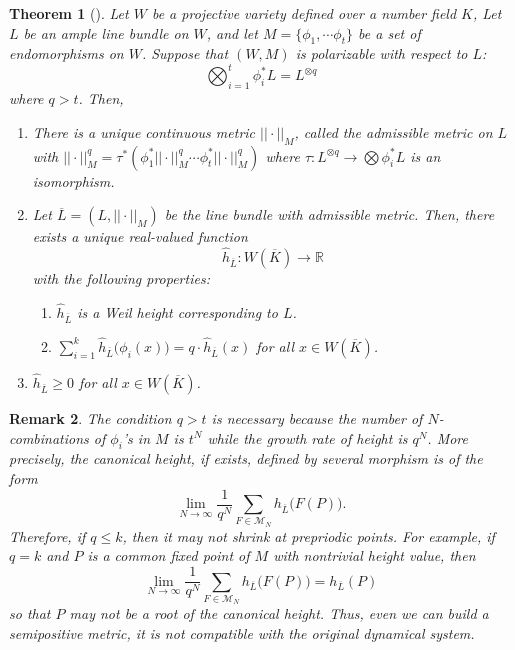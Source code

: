 \documentclass[11pt,letterpaper]{amsart}
\newtheorem{thm}{Theorem}[section]
\newtheorem{rem}[thm]{Remark}
\begin{document}
    \begin{thm}[{\cite[Theorem A,B]{K0}}]\label{kawa}
        Let $W$ be a projective variety defined over a number field $K$, Let $L$ be an ample line bundle on $W$, and let $M = \{\phi_1, \cdots \phi_t\}$ be a set of endomorphisms on $W$. Suppose that $(W,M)$ is polarizable with respect to $L$:
        \[
        \bigotimes_{i=1}^t \phi_i^*L = L^{\otimes q}
        \]
        where $q>t$. Then,
            \begin{enumerate}
                \item There is a unique continuous metric $||\cdot ||_M$, called the admissible metric on $L$ with $||\cdot ||^q_M = \tau^*(\phi_1^*|| \cdot ||^q_M \cdots \phi_t^* ||\cdot ||^q_M)$ where $\tau : L^{\otimes q} \rightarrow \bigotimes \phi_i^*L$ is an isomorphism.
                \item Let $\overline{L}= (L, ||\cdot||_M)$ be the line bundle with admissible metric. Then, there exists a unique real-valued function
                    \[
                        \widehat{h}_{\overline{L}} : W(\overline{K}) \rightarrow \mathbb{R}
                    \]
                with the following properties:
                    \begin{enumerate}
                        \item $\widehat{h}_{\overline{L}}$ is a Weil height corresponding to $L$.
                        \item $\displaystyle \sum_{i=1}^k \widehat{h}_{\overline{L}} \bigl( \phi_i(x)\bigr) = q \cdot \widehat{h}_{\overline{L}} (x)$ for all $x \in W(\overline{K})$.
                    \end{enumerate}
                \item $\widehat{h}_{\overline{L}} \geq 0$ for all $x\in W(\overline{K})$.
            \end{enumerate}
    \end{thm}

    \begin{rem}
        The condition $q>t$ is necessary because the number of $N$-combinations of $\phi_i$'s in $M$ is $t^N$ while the growth rate of height
        is $q^N$. More precisely, the canonical height, if exists, defined by several morphism is of the form
        \[
        \lim_{N\rightarrow \infty} \dfrac{1}{q^N} \sum_{F \in \mathcal{M}_N} h_{\overline{L}} \bigl( F(P) \bigr).
        \]
        Therefore, if $q\leq k$, then it may not shrink at prepriodic points. For example, if $q=k$ and $P$ is a common fixed point of $M$ with nontrivial height value, then
        \[
        \lim_{N\rightarrow \infty} \dfrac{1}{q^N} \sum_{F \in \mathcal{M}_N} h_{\overline{L}}\bigl( F(P) \bigr) = h_{\overline{L}}(P)
        \]
        so that $P$ may not be a root of the canonical height. Thus, even we can build a semipositive metric, it is not compatible with the original dynamical system.
    \end{rem}
\end{document}

